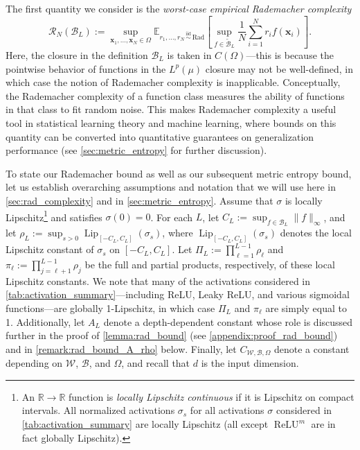 \documentclass{article}
\DeclareMathOperator{\ReLU}{\mathrm{ReLU}}
\DeclareMathOperator{\Lip}{\mathrm{Lip}}
\def\vx{{\bm{x}}}
\def\cB{{\mathcal{B}}}
\def\cR{{\mathcal{R}}}
\def\cW{{\mathcal{W}}}
\def\bE{{\mathbb{E}}}
\newcommand{\R}{\mathbb{R}}
\begin{document}
The first quantity we consider is the \textit{worst-case empirical Rademacher complexity}
\begin{equation} \label{eq:worst_case_empirical_rad_def}
    \cR_N(\cB_L) := \sup_{\vx_1, \dots, \vx_N \in \Omega} \bE_{r_1, \dots, r_N \, \overset{\mathrm{iid}}{\sim} \, \mathrm{Rad}}  \left[ \sup_{f \in \widetilde{\cB}_L} \frac{1}{N}  \sum_{i=1}^N r_i f(\vx_i) \right].
\end{equation}
Here, the closure in the definition $\cB_L$ is taken in $C(\Omega)$---this is because the pointwise behavior of functions in the $L^p(\mu)$ closure may not be well-defined, in which case the notion of Rademacher complexity is inapplicable. Conceptually, the Rademacher complexity of a function class measures the ability of functions in that class to fit random noise. This makes Rademacher complexity a useful tool in statistical learning theory and machine learning, where bounds on this quantity can be converted into quantitative guarantees on generalization performance (see \cref{sec:metric_entropy} for further discussion).


To state our Rademacher bound as well as our subsequent metric entropy bound, let us establish overarching assumptions and notation that we will use here in \cref{sec:rad_complexity} and in \cref{sec:metric_entropy}. Assume that $\sigma$ is locally Lipschitz\footnote{An $\R \to \R$ function is \textit{locally Lipschitz continuous} if it is Lipschitz on compact intervals. All normalized activations $\sigma_s$ for all activations $\sigma$ considered in \cref{tab:activation_summary} are locally Lipschitz (all except $\ReLU^m$ are in fact globally Lipschitz).} and satisfies $\sigma(0) = 0$. For each $L$, let $C_L := \sup_{f \in \cB_L} \| f \|_{\infty}$, and let $\rho_L := \sup_{s > 0} \Lip_{[-C_L, C_L]}(\sigma_s)$, where $\Lip_{[-C_L, C_L]}(\sigma_s)$ denotes the local Lipschitz constant of $\sigma_s$ on $[-C_L, C_L]$. Let $\Pi_L := \prod_{\ell=1}^{L-1} \rho_\ell$ and $\pi_\ell := \prod_{j=\ell+1}^{L-1} \rho_j$ be the full and partial products, respectively, of these local Lipschitz constants. We note that many of the activations considered in \cref{tab:activation_summary}---including ReLU, Leaky ReLU, and various sigmoidal functions---are globally 1-Lipschitz, in which case $\Pi_L$ and $\pi_\ell$ are simply equal to 1. Additionally, let $A_L$ denote a depth-dependent constant whose role is discussed further in the proof of \cref{lemma:rad_bound} (see \cref{appendix:proof_rad_bound}) and in \cref{remark:rad_bound_A_rho} below. Finally, let $C_{\cW, \cB, \Omega}$ denote a constant depending on $\cW$, $\cB$, and $\Omega$, and recall that $d$ is the input dimension. 
\end{document}
